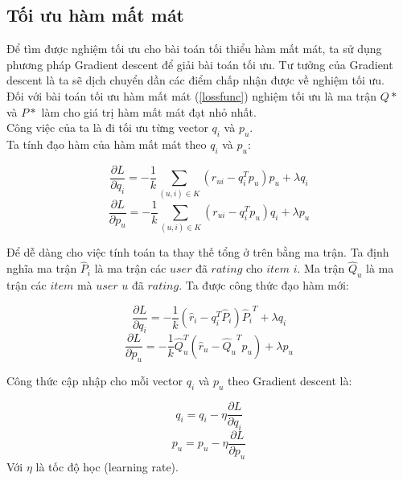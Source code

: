 \subsection{Tối ưu hàm mất mát}
Để tìm được nghiệm tối ưu cho bài toán tối thiểu hàm mất mát, ta sử dụng phương pháp Gradient descent để giải bài toán tối ưu. Tư tưởng của Gradient descent là ta sẽ dịch chuyển dần các điểm chấp nhận được về nghiệm tối ưu.\\
Đối với bài toán tối ưu hàm mất mát (\ref{lossfunc}) nghiệm tối ưu là ma trận $Q*$ và $P*$ làm cho giá trị hàm mất mát đạt nhỏ nhất.\\
Công việc của ta là đi tối ưu từng vector $q_i$ và $p_u$.\\
Ta tính đạo hàm của hàm mất mát theo $q_i$ và $p_u$:
\begin{center}
    \begin{equation}
        \frac{{\partial L}}{{\partial {q_i}}} = -\frac{1}{k}\sum\limits_{(u,i) \in K} {({r_{ui}} - q_i^T{p_u}){p_u} + \lambda {q_i}} 
    \end{equation}
    \begin{equation}
        \frac{{\partial L}}{{\partial {p_u}}} = -\frac{1}{k}\sum\limits_{(u,i) \in K} {({r_{ui}} - q_i^T{p_u}){q_i} + \lambda {p_u}} 
    \end{equation}
\end{center}
Để dễ dàng cho việc tính toán ta thay thế tổng ở trên bằng ma trận. Ta định nghĩa ma trận $\hat P_i$ là ma trận các $user$ đã $rating$ cho $item$ $i$. Ma trận $\hat Q_u$ là ma trận các $item$ mà $user$ $u$ đã $rating$. Ta được công thức đạo hàm mới:
\begin{center}
    \begin{equation}
        \frac{{\partial L}}{{\partial {q_i}}} =  - \frac{1}{k}({{\hat r}_i} - q_i^T{{\hat P}_i}){{\hat P}_i}^T + \lambda {q_i}
    \end{equation}
    \begin{equation}
        \frac{{\partial L}}{{\partial {p_u}}} =  - \frac{1}{k}\hat Q_u^T({{\hat r}_u} - {{\hat Q}_u}^T{p_u}) + \lambda {p_u}
    \end{equation}
\end{center}
Công thức cập nhập cho mỗi vector $q_i$ và $p_u$ theo Gradient descent là:
\begin{center}
    \begin{equation}
        {q_i} = {q_i} - \eta \frac{{\partial L}}{{\partial {q_i}}}
    \end{equation}
    \begin{equation}
        {p_u} = {p_u} - \eta \frac{{\partial L}}{{\partial {p_u}}}
    \end{equation}
    Với $\eta$ là tốc độ học (learning rate). 
\end{center}
